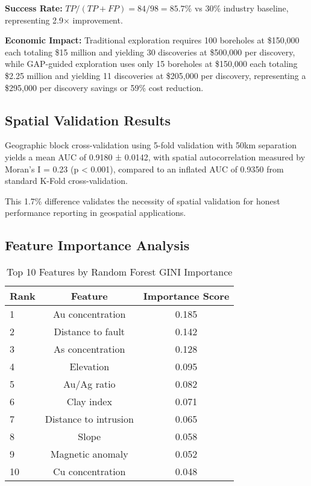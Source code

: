 \documentclass[12pt,a4paper]{article}
\begin{document}
\textbf{Success Rate:} $TP/(TP+FP) = 84/98 = 85.7\%$ vs 30\% industry baseline, representing 2.9$\times$ improvement.

\textbf{Economic Impact:} Traditional exploration requires 100 boreholes at \$150,000 each totaling \$15 million and yielding 30 discoveries at \$500,000 per discovery, while GAP-guided exploration uses only 15 boreholes at \$150,000 each totaling \$2.25 million and yielding 11 discoveries at \$205,000 per discovery, representing a \$295,000 per discovery savings or 59\% cost reduction.

\subsection{Spatial Validation Results}

Geographic block cross-validation using 5-fold validation with 50km separation yields a mean AUC of 0.9180 ± 0.0142, with spatial autocorrelation measured by Moran's I = 0.23 (p < 0.001), compared to an inflated AUC of 0.9350 from standard K-Fold cross-validation.

This 1.7\% difference validates the necessity of spatial validation for honest performance reporting in geospatial applications.

\subsection{Feature Importance Analysis}

\begin{table}[ht]
\centering
\caption{Top 10 Features by Random Forest GINI Importance}
\label{tab:feature_importance}
\begin{tabular}{@{}lcc@{}}
\toprule
\textbf{Rank} & \textbf{Feature} & \textbf{Importance Score} \\
\midrule
1 & Au concentration & 0.185 \\
2 & Distance to fault & 0.142 \\
3 & As concentration & 0.128 \\
4 & Elevation & 0.095 \\
5 & Au/Ag ratio & 0.082 \\
6 & Clay index & 0.071 \\
7 & Distance to intrusion & 0.065 \\
8 & Slope & 0.058 \\
9 & Magnetic anomaly & 0.052 \\
10 & Cu concentration & 0.048 \\
\bottomrule
\end{tabular}
\end{table}
\end{document}
